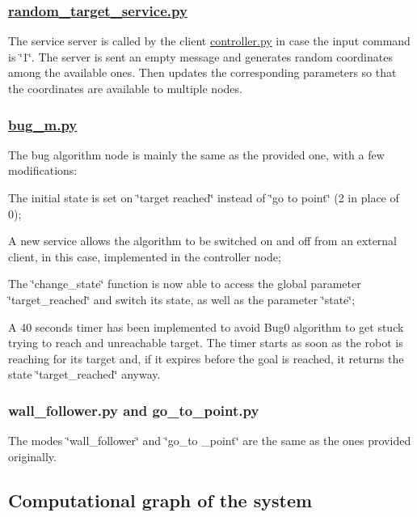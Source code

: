 \subsubsection*{\hyperlink{random__target__service_8py}{random\+\_\+target\+\_\+service.\+py}}

The service server is called by the client \hyperlink{controller_8py}{controller.\+py} in case the input command is \char`\"{}1\char`\"{}. The server is sent an empty message and generates random coordinates among the available ones. Then updates the corresponding parameters so that the coordinates are available to multiple nodes.

\subsubsection*{\hyperlink{bug__m_8py}{bug\+\_\+m.\+py}}

The bug algorithm node is mainly the same as the provided one, with a few modifications\+:
\begin{DoxyItemize}
\item The initial state is set on \char`\"{}target reached\char`\"{} instead of \char`\"{}go to point\char`\"{} (2 in place of 0);
\item A new service allows the algorithm to be switched on and off from an external client, in this case, implemented in the controller node;
\item The \char`\"{}change\+\_\+state\char`\"{} function is now able to access the global parameter \char`\"{}target\+\_\+reached\char`\"{} and switch its state, as well as the parameter \char`\"{}state\char`\"{};
\item A 40 seconds timer has been implemented to avoid Bug0 algorithm to get stuck trying to reach and unreachable target. The timer starts as soon as the robot is reaching for its target and, if it expires before the goal is reached, it returns the state \char`\"{}target\+\_\+reached\char`\"{} anyway.
\end{DoxyItemize}

\subsubsection*{wall\+\_\+follower.\+py and go\+\_\+to\+\_\+point.\+py}

The modes \char`\"{}wall\+\_\+follower\char`\"{} and \char`\"{}go\+\_\+to \+\_\+point\char`\"{} are the same as the ones provided originally.

\subsection*{Computational graph of the system}



